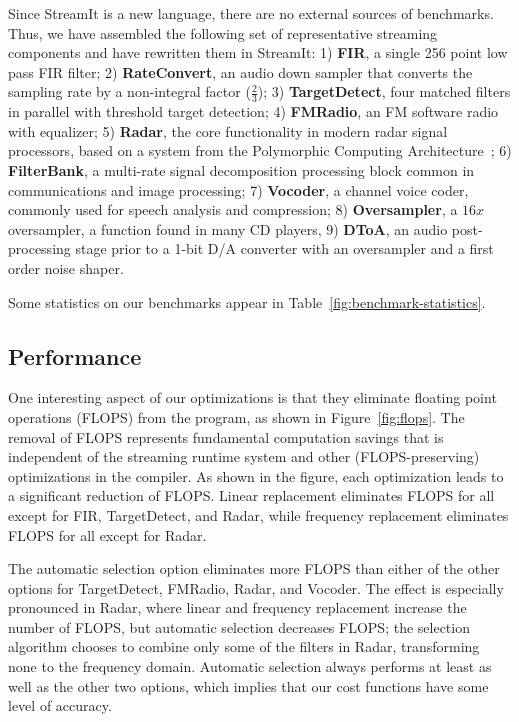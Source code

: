 Since StreamIt is a new language, there are no external sources of
benchmarks.  Thus, we have assembled the following set of
representative streaming components and have rewritten them in
StreamIt: 1) {\bf FIR}, a single 256 point low pass FIR filter; 2)
{\bf RateConvert}, an audio down sampler that converts the sampling
rate by a non-integral factor ($\frac{2}{3}$); 3) {\bf TargetDetect},
four matched filters in parallel with threshold target detection; 4)
{\bf FMRadio}, an FM software radio with equalizer; 5) {\bf Radar},
the core functionality in modern radar signal processors, based on a
system from the Polymorphic Computing Architecture~\cite{pca}; 6) {\bf
FilterBank}, a multi-rate signal decomposition processing block common
in communications and image processing; 7) {\bf Vocoder}, a channel
voice coder, commonly used for speech analysis and compression; 8)
{\bf Oversampler}, a $16x$ oversampler, a function found in many CD
players, 9) {\bf DToA}, an audio post-processing stage prior to a
1-bit D/A converter with an oversampler and a first order noise
shaper.

Some statistics on our benchmarks appear in
Table~\ref{fig:benchmark-statistics}.

\subsection{Performance}

One interesting aspect of our optimizations is that they eliminate
floating point operations (FLOPS) from the program, as shown in
Figure~\ref{fig:flops}.  The removal of FLOPS represents fundamental
computation savings that is independent of the streaming runtime
system and other (FLOPS-preserving) optimizations in the compiler.  As
shown in the figure, each optimization leads to a significant
reduction of FLOPS.  Linear replacement eliminates FLOPS for all
except for FIR, TargetDetect, and Radar, while frequency replacement
eliminates FLOPS for all except for Radar.

The automatic selection option eliminates more FLOPS than either of
the other options for TargetDetect, FMRadio, Radar, and Vocoder.  The
effect is especially pronounced in Radar, where linear and frequency
replacement increase the number of FLOPS, but automatic selection
decreases FLOPS; the selection algorithm chooses to combine only some
of the filters in Radar, transforming none to the frequency domain.
Automatic selection always performs at least as well as the other two
options, which implies that our cost functions have some level of
accuracy.

